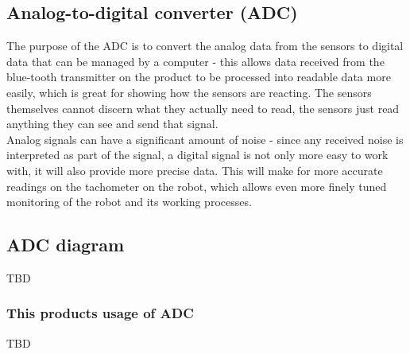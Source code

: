 \subsection{Analog-to-digital converter (ADC)}

The purpose of the ADC is to convert the analog data from the sensors to digital data that can be managed by a computer - this allows data received from the blue-tooth transmitter on the product to be processed into readable data more easily, which is great for showing how the sensors are reacting. The sensors themselves cannot discern what they actually need to read, the sensors just read anything they can see and send that signal. \\
Analog signals can have a significant amount of noise - since any received noise is interpreted as part of the signal, a digital signal is not only more easy to work with, it will also provide more precise data. This will make for more accurate readings on the tachometer on the robot, which allows even more finely tuned monitoring of the robot and its working processes. \\

\subsection{ADC diagram} 
TBD

\subsubsection{This products usage of ADC}

TBD
